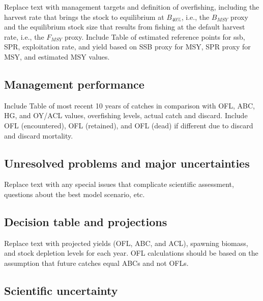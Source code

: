 \documentclass[11pt,
  letterpaper,
]{article}
\begin{document}
Replace text with management targets and definition of overfishing, including the harvest rate that brings the stock to equilibrium at \(B_{40\%}\), i.e., the \(B_{MSY}\) proxy and the equilibrium stock size that results from fishing at the default harvest rate, i.e., the \(F_{MSY}\) proxy. Include Table of estimated reference points for ssb, SPR, exploitation rate, and yield based on SSB proxy for MSY, SPR proxy for MSY, and estimated MSY values.

\hypertarget{management-performance}{%
\subsection*{Management performance}\label{management-performance}}

Include Table of most recent 10 years of catches in comparison with OFL, ABC, HG, and OY/ACL values, overfishing levels, actual catch and discard. Include OFL (encountered), OFL (retained), and OFL (dead) if different due to discard and discard mortality.

\hypertarget{unresolved-problems-and-major-uncertainties}{%
\subsection*{Unresolved problems and major uncertainties}\label{unresolved-problems-and-major-uncertainties}}

Replace text with any special issues that complicate scientific assessment, questions about the best model scenario, etc.

\hypertarget{decision-table-and-projections}{%
\subsection*{Decision table and projections}\label{decision-table-and-projections}}

Replace text with projected yields (OFL, ABC, and ACL), spawning biomass, and stock depletion levels for each year. OFL calculations should be based on the assumption that future catches equal ABCs and not OFLs.

\hypertarget{scientific-uncertainty}{%
\subsection*{Scientific uncertainty}\label{scientific-uncertainty}}
\end{document}

